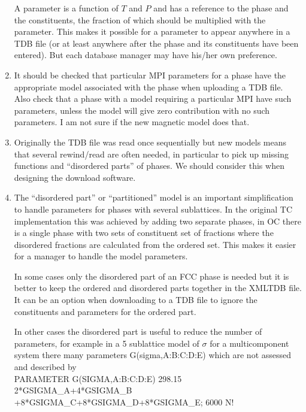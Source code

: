 \documentclass[12pt]{article}
\begin{document}
\begin{enumerate}
  A parameter is a function of $T$ and $P$ and has a reference to the
  phase and the constituents, the fraction of which should be
  multiplied with the parameter.  This makes it possible for a
  parameter to appear anywhere in a TDB file (or at least anywhere
  after the phase and its constituents have been entered).  But each
  database manager may have his/her own preference.
  
\item It should be checked that particular MPI parameters for a phase
  have the appropriate model associated with the phase when uploading
  a TDB file.  Also check that a phase with a model requiring a
  particular MPI have such parameters, unless the model will give zero
  contribution with no such parameters.  I am not sure if the new
  magnetic model does that.

\item Originally the TDB file was read once sequentially but new
  models means that several rewind/read are often needed, in
  particular to pick up missing functions and ``disordered parts'' of
  phases.  We should consider this when designing the download
  software.

\item The ``disordered part'' or ``partitioned'' model is an important
  simplification to handle parameters for phases with several
  sublattices.  In the original TC implementation this was achieved by
  adding two separate phases, in OC there is a single phase with two
  sets of constituent set of fractions where the disordered fractions
  are calculated from the ordered set.  This makes it easier for a
  manager to handle the model parameters.

  In some cases only the disordered part of an FCC phase is needed but
  it is better to keep the ordered and disordered parts together in
  the XMLTDB file.  It can be an option when downloading to a TDB file
  to ignore the constituents and parameters for the ordered part.

  In other cases the disordered part is useful to reduce the number of
  parameters, for example in a 5 sublattice model of $\sigma$ for a
  multicomponent system there many parameters G(sigma,A:B:C:D:E) which
  are not assessed and described by\\

  PARAMETER G(SIGMA,A:B:C:D:E) 298.15 2*GSIGMA\_A+4*GSIGMA\_B\\
  +8*GSIGMA\_C+8*GSIGMA\_D+8*GSIGMA\_E; 6000 N!


\end{enumerate}
\end{document}
